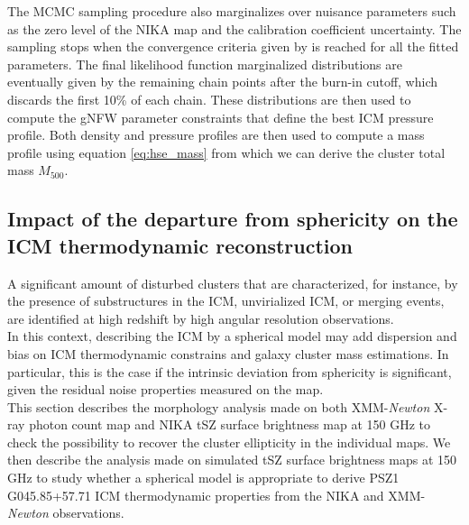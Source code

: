 \documentclass[traditabstract]{aa}
\begin{document}
The MCMC sampling procedure also marginalizes over nuisance parameters such as the zero level of the NIKA map and the calibration coefficient uncertainty. The sampling stops when the convergence criteria given by \citealt{convergence_MCMC} is reached for all the fitted parameters. The final likelihood function marginalized distributions are eventually given by the remaining chain points after the burn-in cutoff, which discards the first 10\% of each chain. These distributions are then used to compute the gNFW parameter constraints that define the best ICM pressure profile. Both density and pressure profiles are then used to compute a mass profile using equation \ref{eq:hse_mass} from which we can derive the cluster total mass $M_{\mathrm{500}}$.

\subsection{Impact of the departure from sphericity on the ICM thermodynamic reconstruction}\label{sec:Impact_mass}

A significant amount of disturbed clusters that are characterized, for instance, by the presence of substructures in the ICM, unvirialized ICM, or merging events, are identified at high redshift by high angular resolution observations.\\
\indent In this context, describing the ICM by a spherical model may add dispersion and bias on ICM thermodynamic constrains and galaxy cluster mass estimations. In particular, this is the case if the intrinsic deviation from sphericity is significant, given the residual noise properties measured on the map.\\
\indent This section describes the morphology analysis made on both XMM-{\it Newton} X-ray photon count map and NIKA tSZ surface brightness map at 150 GHz to check the possibility to recover the cluster ellipticity in the individual maps. We then describe the analysis made on simulated tSZ surface brightness maps at 150 GHz to study whether a spherical model is appropriate to derive \mbox{PSZ1\,G045.85+57.71} ICM thermodynamic properties from the NIKA and XMM-{\it Newton} observations.

\end{document}
